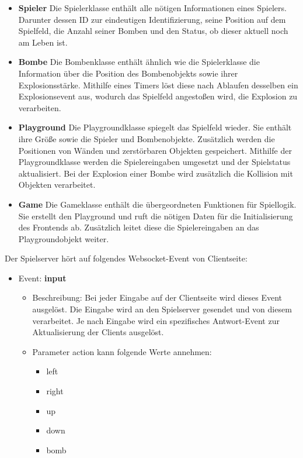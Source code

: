 \documentclass[conference]{IEEEtran}
\begin{document}
\begin{itemize}
    \item \textbf{Spieler}
    Die Spielerklasse enthält alle nötigen Informationen eines 	Spielers. Darunter dessen ID zur eindeutigen 					Identifizierung, seine Position auf dem Spielfeld, die 			Anzahl seiner Bomben und den Status, ob dieser aktuell noch am 			Leben ist.
    \smallskip
    \item \textbf{Bombe} 
    Die Bombenklasse enthält ähnlich wie die Spielerklasse die 	Information über die Position des Bombenobjekts sowie ihrer 		Explosionsstärke. Mithilfe eines Timers löst diese nach 		Ablaufen desselben ein Explosionsevent aus, wodurch das 		Spielfeld angestoßen wird, die Explosion zu verarbeiten.
    \smallskip
    \item \textbf{Playground}
    Die Playgroundklasse spiegelt das Spielfeld wieder. Sie 
    enthält ihre Größe sowie die Spieler und Bombenobjekte.
    Zusätzlich werden die Positionen von Wänden und 
    zerstörbaren Objekten gespeichert. Mithilfe der 
    Playgroundklasse werden die Spielereingaben
   	umgesetzt und der Spielstatus aktualisiert. Bei der
   	Explosion einer Bombe wird zusätzlich die Kollision 
   	mit Objekten verarbeitet.
    \smallskip
    \item \textbf{Game}
    Die Gameklasse enthält die übergeordneten Funktionen für
    Spiellogik. Sie erstellt den Playground und ruft die 
    nötigen Daten für die Initialisierung des Frontends ab.
    Zusätzlich leitet diese die Spielereingaben an das
    Playgroundobjekt weiter.
    
\smallskip

\end{itemize}
Der Spielserver hört auf folgendes Websocket-Event von Clientseite:
\begin{itemize}
\item Event: \textbf{input}
\begin{itemize}
\item Beschreibung:
    Bei jeder Eingabe auf der Clientseite wird dieses Event ausgelöst. Die Eingabe wird an den Spielserver gesendet und von diesem verarbeitet. Je nach Eingabe wird ein spezifisches Antwort-Event zur Aktualisierung der Clients ausgelöst.
    
\item Parameter \glqq action\grqq{} kann folgende Werte annehmen:
\begin{itemize}
    \item left
    \item right
    \item up
    \item down
    \item bomb
\end{itemize}
\end{itemize}
\end{itemize}
\end{document}
